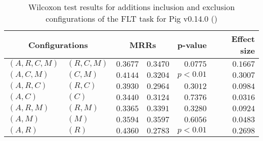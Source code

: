 
\begin{table}
\begin{spacing}{1.2}
\centering
\caption{Wilcoxon test results for additions inclusion and exclusion configurations of the FLT task for Pig v0.14.0 (\ctwo)}
\label{table:versus-wilcox-pig-flt-additions}
\begin{tabular}{ll|rr|rr}
\toprule
      \multicolumn{2}{c|}{Configurations} &                \multicolumn{2}{c|}{MRRs} &             p-value & Effect size \\
\midrule
 $(A,R,C,M)$ &  $(R,C,M)$ &  $\bm{0.3677}$ &       $0.3470$ & $0.0775$ &    $0.1667$ \\
   $(A,C,M)$ &    $(C,M)$ &  $\bm{0.4144}$ &       $0.3204$ & $p<0.01$ &    $0.3007$ \\
   $(A,R,C)$ &    $(R,C)$ &  $\bm{0.3930}$ &       $0.2964$ & $0.3012$ &    $0.0984$ \\
     $(A,C)$ &      $(C)$ &  $\bm{0.3440}$ &       $0.3124$ & $0.7376$ &    $0.0316$ \\
   $(A,R,M)$ &    $(R,M)$ &       $0.3365$ &  $\bm{0.3391}$ & $0.3280$ &    $0.0924$ \\
     $(A,M)$ &      $(M)$ &       $0.3594$ &  $\bm{0.3597}$ & $0.6056$ &    $0.0483$ \\
     $(A,R)$ &      $(R)$ &  $\bm{0.4360}$ &       $0.2783$ & $p<0.01$ &    $0.2698$ \\
\bottomrule
\end{tabular}

\end{spacing}
\end{table}

